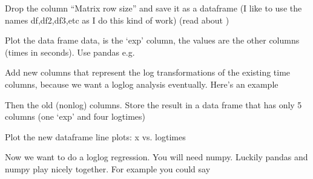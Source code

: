 \documentclass[letterpaper,10pt,english]{jupyterBook}
\begin{document}
\sphinxAtStartPar
Drop the column “Matrix row size” and save it as a  dataframe (I like to use the names df,df2,df3,etc as I do this kind of work) (read about )

\sphinxAtStartPar
Plot the data frame data,  is the ‘exp’ column, the  values are the other columns (times in seconds). Use pandas e.g.

\begin{sphinxVerbatim}[commandchars=\\\{\}]
\end{sphinxVerbatim}

\sphinxAtStartPar
Add new columns that represent the log transformations of the existing time columns, because we want a log\sphinxhyphen{}log analysis eventually. Here’s an example

\begin{sphinxVerbatim}[commandchars=\\\{\}]
\PYG{p}{[}\PYG{p}{]}  \PYG{p}{[}\PYG{p}{]} 
\end{sphinxVerbatim}

\sphinxAtStartPar
Then  the old (non\sphinxhyphen{}log) columns. Store the result in a  data frame that has only 5 columns (one ‘exp’ and four log\sphinxhyphen{}times)

\sphinxAtStartPar
Plot the new dataframe line plots: x vs. log\sphinxhyphen{}times

\sphinxAtStartPar
Now we want to do a log\sphinxhyphen{}log regression. You will need numpy. Luckily pandas and numpy play nicely together. For example you could say

\begin{sphinxVerbatim}[commandchars=\\\{\}]
  
  \PYG{p}{[}\PYG{p}{]}
  \PYG{p}{[}\PYG{p}{]}
  
\end{sphinxVerbatim}
\end{document}
